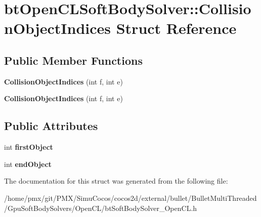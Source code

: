 \hypertarget{structbtOpenCLSoftBodySolver_1_1CollisionObjectIndices}{}\section{bt\+Open\+C\+L\+Soft\+Body\+Solver\+:\+:Collision\+Object\+Indices Struct Reference}
\label{structbtOpenCLSoftBodySolver_1_1CollisionObjectIndices}
\subsection*{Public Member Functions}
\begin{DoxyCompactItemize}
\item 
\mbox{\label{structbtOpenCLSoftBodySolver_1_1CollisionObjectIndices_a23285e92cd958fbc91f6e4a2cd98ea1b}} 
{\bfseries Collision\+Object\+Indices} (int f, int e)
\item 
\mbox{\label{structbtOpenCLSoftBodySolver_1_1CollisionObjectIndices_a23285e92cd958fbc91f6e4a2cd98ea1b}} 
{\bfseries Collision\+Object\+Indices} (int f, int e)
\end{DoxyCompactItemize}
\subsection*{Public Attributes}
\begin{DoxyCompactItemize}
\item 
\mbox{\label{structbtOpenCLSoftBodySolver_1_1CollisionObjectIndices_a00524289be04be8f381444edd52e661f}} 
int {\bfseries first\+Object}
\item 
\mbox{\label{structbtOpenCLSoftBodySolver_1_1CollisionObjectIndices_ac6cf2fb397e2e87c6cbf7cb7f64b2967}} 
int {\bfseries end\+Object}
\end{DoxyCompactItemize}


The documentation for this struct was generated from the following file\+:\begin{DoxyCompactItemize}
\item 
/home/pmx/git/\+P\+M\+X/\+Simu\+Cocos/cocos2d/external/bullet/\+Bullet\+Multi\+Threaded/\+Gpu\+Soft\+Body\+Solvers/\+Open\+C\+L/bt\+Soft\+Body\+Solver\+\_\+\+Open\+C\+L.\+h\end{DoxyCompactItemize}
